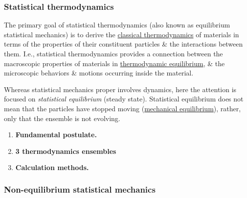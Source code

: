 \documentclass{article}
\begin{document}
\subsubsection{Statistical thermodynamics}
The primary goal of statistical thermodynamics (also known as equilibrium statistical mechanics) is to derive the \href{https://en.wikipedia.org/wiki/Classical_thermodynamics}{classical thermodynamics} of materials in terms of the properties of their constituent particles \& the interactions between them. I.e., statistical thermodynamics provides a connection between the macroscopic properties of materials in \href{https://en.wikipedia.org/wiki/Thermodynamic_equilibrium}{thermodynamic equilibrium}, \& the microscopic behaviors \& motions occurring inside the material.

Whereas statistical mechanics proper involves dynamics, here the attention is focused on {\it statistical equilibrium} (steady state). Statistical equilibrium does not mean that the particles have stopped moving (\href{https://en.wikipedia.org/wiki/Mechanical_equilibrium}{mechanical equilibrium}), rather, only that the ensemble is not evolving.
\begin{enumerate}
	\item {\bf Fundamental postulate.}
	\item {\bf3 thermodynamics ensembles}
	\item {\bf Calculation methods.}
\end{enumerate}

\subsubsection{Non-equilibrium statistical mechanics}
\end{document}
